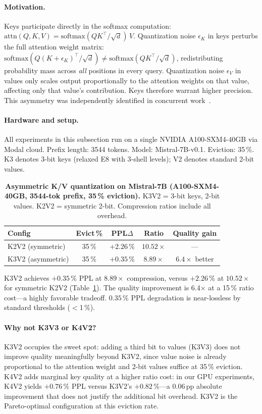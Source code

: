 \documentclass{article}
\begin{document}
\paragraph{Motivation.}
Keys participate directly in the softmax computation:
$\text{attn}(Q, K, V) = \text{softmax}(QK^\top/\sqrt{d})\,V$.
Quantization noise $\epsilon_K$ in keys perturbs the full attention weight matrix:
$\text{softmax}(Q(K+\epsilon_K)^\top/\sqrt{d}) \neq \text{softmax}(QK^\top/\sqrt{d})$,
redistributing probability mass across \emph{all} positions in every query.
Quantization noise $\epsilon_V$ in values only scales output proportionally to
the attention weights on that value, affecting only that value's contribution.
Keys therefore warrant higher precision. This asymmetry was independently
identified in concurrent work~\cite{turboquant_plus2026}.

\paragraph{Hardware and setup.}
All experiments in this subsection run on a single NVIDIA A100-SXM4-40GB via Modal
cloud. Prefix length: 3544 tokens. Model: Mistral-7B-v0.1. Eviction: 35\,\%.
K3 denotes 3-bit keys (relaxed E8 with 3-shell levels); V2 denotes standard
2-bit values.

\begin{table}[h]
\centering
\caption{\textbf{Asymmetric K/V quantization on Mistral-7B (A100-SXM4-40GB,
  3544-tok prefix, 35\,\% eviction).} K3V2 = 3-bit keys, 2-bit values.
  K2V2 = symmetric 2-bit. Compression ratios include all overhead.}
\label{tab:asymmetric}
\begin{tabular}{@{}lcccc@{}}
\toprule
Config & Evict\,\% & PPL$\Delta$ & Ratio & Quality gain \\
\midrule
K2V2 (symmetric)  & 35\,\% & $+2.26$\,\% & $10.52\times$ & --- \\
K3V2 (asymmetric) & 35\,\% & $+0.35$\,\% & $8.89\times$  & $6.4\times$ better \\
\bottomrule
\end{tabular}
\end{table}

K3V2 achieves $+0.35$\,\% PPL at $8.89\times$ compression, versus $+2.26$\,\% at
$10.52\times$ for symmetric K2V2 (Table~\ref{tab:asymmetric}). The quality
improvement is 6.4$\times$ at a 15\,\% ratio cost---a highly favorable tradeoff.
$0.35$\,\% PPL degradation is near-lossless by standard thresholds ($<$1\,\%).

\paragraph{Why not K3V3 or K4V2?}
K3V2 occupies the sweet spot: adding a third bit to values (K3V3) does not
improve quality meaningfully beyond K3V2, since value noise is already
proportional to the attention weight and 2-bit values suffice at 35\,\% eviction.
K4V2 adds marginal key quality at a higher ratio cost: in our GPU experiments,
K4V2 yields $+0.76$\,\% PPL versus K3V2's $+0.82$\,\%---a $0.06$\,pp absolute
improvement that does not justify the additional bit overhead. K3V2 is the
Pareto-optimal configuration at this eviction rate.
\end{document}
